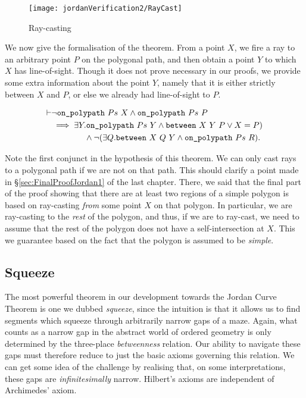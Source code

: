 \begin{figure}
\centering\texttt{[image: jordanVerification2/RayCast]}
\caption{Ray-casting}
\label{fig:RayCast}
\end{figure}

We now give the formalisation of the theorem. From a point $X$, we fire a ray to an arbitrary point $P$ on the polygonal path, and then obtain a point $Y$ to which $X$ has line-of-sight. Though it does not prove necessary in our proofs, we provide some extra information about the point $Y$, namely that it is either strictly between $X$ and $P$, or else we already had line-of-sight to $P$. 

\begin{equation}\label{eq:RayCast}
  \begin{aligned}
    \vdash&\neg\texttt{on\_polypath}\ Ps\ X \wedge \texttt{on\_polypath}\ Ps\ P\\
    &\implies \exists Y. \texttt{on\_polypath}\ Ps\ Y \wedge \texttt{between}\ X\ Y\ P \vee X = P)\\
    &\qquad\qquad \wedge \neg(\exists Q. \texttt{between}\ X\ Q\ Y \wedge \texttt{on\_polypath}\ Ps\ R).
  \end{aligned}
\end{equation}

Note the first conjunct in the hypothesis of this theorem. We can only cast rays to a polygonal path if we are not on that path. This should clarify a point made in \S\ref{sec:FinalProofJordan1} of the last chapter. There, we said that the final part of the proof showing that there are at least two regions of a simple polygon is based on ray-casting \emph{from} some point $X$ on that polygon. In particular, we are ray-casting to the \emph{rest} of the polygon, and thus, if we are to ray-cast, we need to assume that the rest of the polygon does not have a self-intersection at $X$. This we guarantee based on the fact that the polygon is assumed to be \emph{simple}.

\subsection{Squeeze}
The most powerful theorem in our development towards the Jordan Curve Theorem is one we dubbed \emph{squeeze}, since the intuition is that it allows us to find segments which squeeze through arbitrarily narrow gaps of a maze. Again, what counts as a narrow gap in the abstract world of ordered geometry is only determined by the three-place \emph{betweenness} relation. Our ability to navigate these gaps must therefore reduce to just the basic axioms governing this relation. We can get some idea of the challenge by realising that, on some interpretations, these gaps are \emph{infinitesimally} narrow. Hilbert's axioms are independent of Archimedes' axiom.

